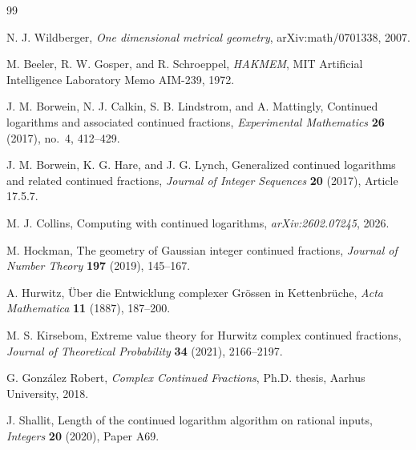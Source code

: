 \documentclass[10pt]{article}
\theoremstyle{definition}
\theoremstyle{remark}
\begin{document}
\begin{thebibliography}{99}

N. J. Wildberger,
\emph{One dimensional metrical geometry},
arXiv:math/0701338, 2007.

M. Beeler, R. W. Gosper, and R. Schroeppel,
\emph{HAKMEM}, MIT Artificial Intelligence Laboratory Memo AIM-239, 1972.

J. M. Borwein, N. J. Calkin, S. B. Lindstrom, and A. Mattingly,
Continued logarithms and associated continued fractions,
\emph{Experimental Mathematics} \textbf{26} (2017), no.~4, 412--429.

J. M. Borwein, K. G. Hare, and J. G. Lynch,
Generalized continued logarithms and related continued fractions,
\emph{Journal of Integer Sequences} \textbf{20} (2017), Article 17.5.7.

M. J. Collins,
Computing with continued logarithms,
\emph{arXiv:2602.07245}, 2026.

M. Hockman,
The geometry of Gaussian integer continued fractions,
\emph{Journal of Number Theory} \textbf{197} (2019), 145--167.

A. Hurwitz,
\"Uber die Entwicklung complexer Gr\"ossen in Kettenbr\"uche,
\emph{Acta Mathematica} \textbf{11} (1887), 187--200.

M. S. Kirsebom,
Extreme value theory for Hurwitz complex continued fractions,
\emph{Journal of Theoretical Probability} \textbf{34} (2021), 2166--2197.

G. Gonz\'alez Robert,
\emph{Complex Continued Fractions}, Ph.D. thesis, Aarhus University, 2018.

J. Shallit,
Length of the continued logarithm algorithm on rational inputs,
\emph{Integers} \textbf{20} (2020), Paper A69.

\end{thebibliography}
\end{document}
